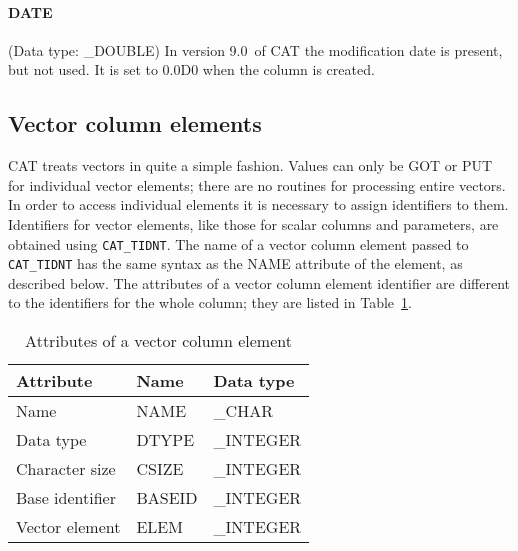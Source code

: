 \documentclass[11pt,twoside]{starlink}
\providecommand{\CATversion}{9.0~}
\begin{document}
\paragraph{DATE}
(Data type: \_DOUBLE)
In version \CATversion of CAT the modification date is present, but
not used. It is set to 0.0D0 when the column is created.


\subsection{\label{COLUMN_ELM}Vector column elements}

CAT treats vectors in quite a simple fashion. Values can only be GOT
or PUT for individual vector elements; there are no routines for
processing entire vectors. In order to access individual elements it
is necessary to assign identifiers to them. Identifiers for vector
elements, like those for scalar columns and parameters, are obtained
using \texttt{CAT\_TIDNT}. The name of a vector column element passed to
\texttt{CAT\_TIDNT} has the same syntax as the NAME attribute of the
element, as described below. The attributes of a vector column element
identifier are different to the identifiers for the whole column; they
are listed in Table~\ref{VCOL_ELEM}.

\begin{table}[htbp]

\begin{center}
\begin{tabular}{lll}
Attribute       & Name    & Data type  \\ \hline
Name            & NAME    & \_CHAR     \\
Data type       & DTYPE   & \_INTEGER  \\
Character size  & CSIZE   & \_INTEGER  \\
Base identifier & BASEID  & \_INTEGER  \\
Vector element  & ELEM    & \_INTEGER  \\
\end{tabular}
\end{center}

\caption{\label{VCOL_ELEM}Attributes of a vector column element}

\end{table}
\end{document}
